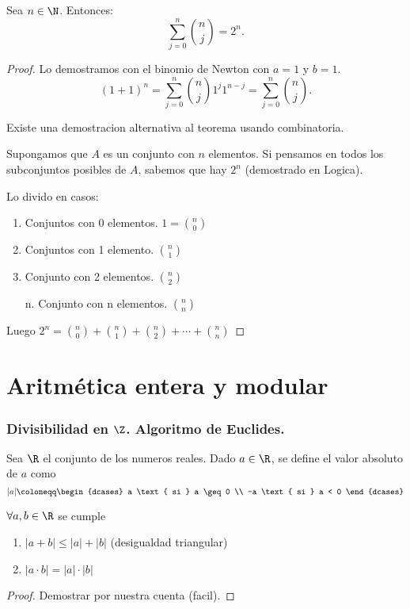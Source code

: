 \begin{theorem}
	Sea \(n \in \N \). Entonces:
	\[
		\sum_{j =0 }^{n } \binom{n }{j } = 2^{n }.
	\]
\end{theorem}
\begin{proof}
	Lo demostramos con el binomio de Newton con \(a = 1 \) y \(b = 1 \).
	\[
		(1+1)^{n} = \sum_{j =0 }^{n } \binom{n }{j} 1^{j} 1^{n -j} = \sum_{j =0 }^{n } \binom{n }{j}.
	\]

	Existe una demostracion alternativa al teorema usando combinatoria.

	Supongamos que \(A \) es un conjunto con \(n \) elementos. Si pensamos en todos los subconjuntos posibles de \(A \), sabemos que hay \(2^{n } \) (demostrado en Logica).

	Lo divido en casos:
	\begin{enumerate}
		\item Conjuntos con 0 elementos. \(1 = \binom{n }{0 }\)
		\item Conjuntos con 1 elemento. \(\binom{n }{1 }\)
		\item Conjunto con 2 elementos. \(\binom{n }{2}\)
		\item[n.] Conjunto con n elementos. \(\binom{n }{n }\)
	\end{enumerate}
	Luego \(2^{n }= \binom{n }{0 } + \binom{n}{1 } + \binom{n }{2 } + \cdots + \binom{n }{n }\)
\end{proof}

\part{Aritmética entera y modular}
\section{Divisibilidad en \(\Z \). Algoritmo de Euclides.}
\begin{definition}
	Sea \(\R \) el conjunto de los numeros reales. Dado \(a \in \R \), se define el valor absoluto de \(a \) como
	\[
		|a| \coloneqq \begin{dcases}
			a \text{ si } a \geq 0 \\
			-a \text{ si } a < 0
		\end{dcases}
	\]
\end{definition}

\begin{proposition}
	\(\forall  a,b \in \R \) se cumple
	\begin{enumerate}
		\item \(|a + b| \leq |a| + |b| \) (desigualdad triangular)
		\item \(|a \cdot b | = |a| \cdot |b| \)
	\end{enumerate}
\end{proposition}
\begin{proof}
	Demostrar por nuestra cuenta (facil).
\end{proof}

